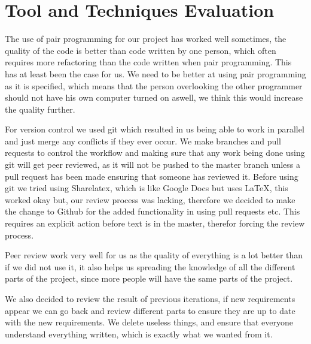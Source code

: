 \section{Tool and Techniques Evaluation}

The use of pair programming for our project has worked well sometimes, the quality of the code is better than code written by one person, which often requires more refactoring than the code written when pair programming.
This has at least been the case for us. 
We need to be better at using pair programming as it is specified, which means that the person overlooking the other programmer should not have his own computer turned on aswell, we think this would increase the quality further. 

For version control we used git which resulted in us being able to work in parallel and just merge any conflicts if they ever occur.
We make branches and pull requests to control the workflow and making sure that any work being done using git will get peer reviewed, as it will not be pushed to the master branch unless a pull request has been made ensuring that someone has reviewed it.
Before using git we tried using Sharelatex, which is like Google Docs but uses \LaTeX, this worked okay but, our review process was lacking, therefore we decided to make the change to Github for the added functionality in using pull requests etc. 
This requires an explicit action before text is in the master, therefor forcing the review process. 

Peer review work very well for us as the quality of everything is a lot better than if we did not use it, it also helps us spreading the knowledge of all the different parts of the project, since more people will have the same parts of the project.

We also decided to review the result of previous iterations, if new requirements appear we can go back and review different parts to ensure they are up to date with the new requirements.
We delete useless things, and ensure that everyone understand everything written, which is exactly what we wanted from it.